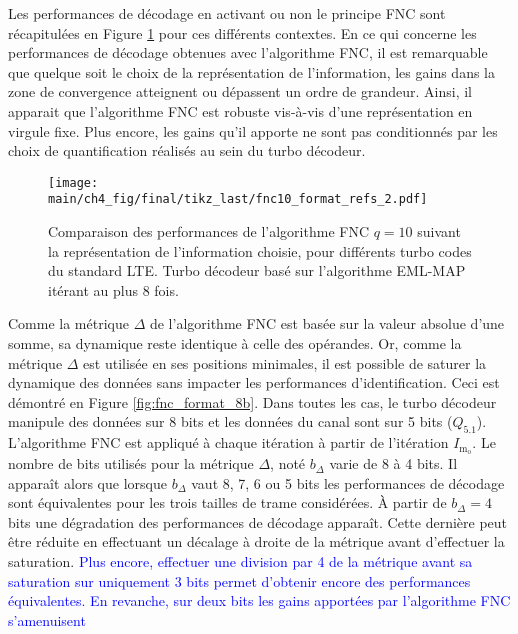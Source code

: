 Les performances de décodage en activant ou non le principe FNC sont récapitulées en Figure \ref{fig:fnc_format_refs} pour
ces différents contextes. 
En ce qui concerne les performances de décodage obtenues avec l'algorithme FNC, il est remarquable que quelque soit le 
choix de la représentation de l'information, les gains dans la zone de convergence atteignent ou dépassent un ordre de 
grandeur. Ainsi, il apparait que l'algorithme FNC est robuste vis-à-vis d'une représentation en virgule fixe. Plus encore, les
gains qu'il apporte ne sont pas conditionnés par les choix de quantification réalisés au sein du turbo décodeur.


\begin{figure}[!t]
	\centering
	\texttt{[image: main/ch4\_fig/final/tikz\_last/fnc10\_format\_refs\_2.pdf]}
	\caption{Comparaison des performances de l'algorithme FNC $q=10$ 
	suivant la représentation de l'information choisie, pour différents turbo codes du standard LTE.
	Turbo décodeur basé sur l'algorithme EML-MAP itérant au plus 8 fois.
	\label{fig:fnc_format_refs}}
\end{figure}

Comme la métrique $\Delta$ de l'algorithme FNC est basée sur la valeur absolue d'une somme, sa dynamique reste identique 
à celle des opérandes. Or, comme la métrique $\Delta$  est utilisée en ses positions minimales, il est possible de 
saturer la dynamique des données sans impacter les performances d'identification. Ceci est démontré en Figure 
\ref{fig:fnc_format_8b}. Dans toutes les cas, le turbo décodeur manipule des données sur 8 bits et les données du canal 
sont sur 5 bits ($Q_{5.1}$). L'algorithme FNC est appliqué à chaque itération à partir de l'itération $I_{\text{m}_\text{o}}$. Le 
nombre de bits utilisés pour la métrique $\Delta$, noté $b_{\Delta}$ varie de 8 à 4 bits. Il 
apparaît alors que lorsque $b_{\Delta}$ vaut 8, 7, 6 ou 5 bits les performances de décodage sont équivalentes pour les trois tailles de trame considérées. À partir de $b_{\Delta} = 4$ bits une dégradation des 
performances de décodage apparaît. Cette dernière peut être réduite en effectuant un décalage à droite de la métrique 
avant d'effectuer la saturation. \textcolor{blue}{Plus encore, effectuer une division par 4 de la métrique avant
sa saturation sur uniquement 3 bits permet d'obtenir encore des performances équivalentes. En revanche, sur deux bits 
les gains apportées par l'algorithme FNC s'amenuisent}

